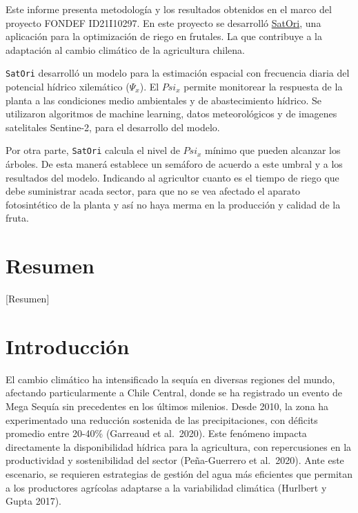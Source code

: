 \documentclass[
  letterpaper,
  DIV=11,
  numbers=noendperiod]{scrreprt}
\begin{document}

Este informe presenta metodología y los resultados obtenidos en el marco
del proyecto FONDEF ID21I10297. En este proyecto se desarrolló
\href{https://s4tori.cl}{SatOri}, una aplicación para la optimización de
riego en frutales. La que contribuye a la adaptación al cambio climático
de la agricultura chilena.

\texttt{SatOri} desarrolló un modelo para la estimación espacial con
frecuencia diaria del potencial hídrico xilemático (\(\Psi_x\)). El
\(Psi_x\) permite monitorear la respuesta de la planta a las condiciones
medio ambientales y de abastecimiento hídrico. Se utilizaron algoritmos
de machine learning, datos meteorológicos y de imagenes satelitales
Sentine-2, para el desarrollo del modelo.

Por otra parte, \texttt{SatOri} calcula el nivel de \(Psi_x\) mínimo que
pueden alcanzar los árboles. De esta manerá establece un semáforo de
acuerdo a este umbral y a los resultados del modelo. Indicando al
agricultor cuanto es el tiempo de riego que debe suministrar acada
sector, para que no se vea afectado el aparato fotosintético de la
planta y así no haya merma en la producción y calidad de la fruta.


\chapter*{Resumen}\label{resumen}


{[}Resumen{]}


\chapter*{Introducción}\label{introducciuxf3n}


El cambio climático ha intensificado la sequía en diversas regiones del
mundo, afectando particularmente a Chile Central, donde se ha registrado
un evento de Mega Sequía sin precedentes en los últimos milenios. Desde
2010, la zona ha experimentado una reducción sostenida de las
precipitaciones, con déficits promedio entre 20-40\% (Garreaud et
al.~2020). Este fenómeno impacta directamente la disponibilidad hídrica
para la agricultura, con repercusiones en la productividad y
sostenibilidad del sector (Peña-Guerrero et al.~2020). Ante este
escenario, se requieren estrategias de gestión del agua más eficientes
que permitan a los productores agrícolas adaptarse a la variabilidad
climática (Hurlbert y Gupta 2017).
\end{document}
